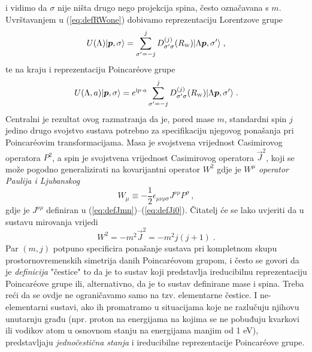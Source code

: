i vidimo da $\sigma$ nije ništa drugo nego projekcija spina, često označavana s $m$.
Uvrštavanjem u (\ref{eq:defRWone}) dobivamo reprezentaciju Lorentzove
grupe
\begin{equation}
    U(\Lambda) \ket{\vec{p}, \sigma} = 
     \sum_{\sigma'=-j}^{j} D^{(j)}_{\sigma'\sigma}(R_{\scriptscriptstyle\rm W})
     \ket{\Lambda\vec{p}, \sigma'} \;,
\end{equation}
te na kraju i reprezentaciju Poincar\'{e}ove grupe
\begin{equation}
    U(\Lambda, a) \ket{\vec{p}, \sigma} =  e^{\rmi p \cdot a}
     \sum_{\sigma'=-j}^{j} D^{(j)}_{\sigma'\sigma}(R_{\scriptscriptstyle\rm W})
     \ket{\Lambda\vec{p}, \sigma'} \;.
\end{equation}
Centralni je rezultat ovog razmatranja da je, pored mase $m$, standardni spin $j$
jedino drugo svojstvo sustava potrebno za specifikaciju njegovog ponašanja
pri Poincar\'{e}ovim transformacijama.
Masa je svojstvena vrijednost Casimirovog operatora $P^2$, a spin
je svojstvena vrijednost Casimirovog operatora $\vec{J}^2$, koji se
može pogodno generalizirati na kovarijantni operator $W^2$ gdje je
$W^{\mu}$ \emph{operator Paulija i Ljubanskog}
\begin{equation}
    W_{\mu} \equiv - \frac{1}{2} \epsilon_{\mu \nu \rho \sigma}
    J^{\nu \rho} P^{\sigma} \,,
    \label{eq:defPLj}
\end{equation}
gdje je $J^{\nu \rho}$ definiran u (\ref{eq:defJmn})--(\ref{eq:defJi0}).
Čitatelj će se lako uvjeriti da u sustavu mirovanja vrijedi
\begin{equation}
    W^2 = - m^2 \vec{J}^2 = -m^2 j (j+1) \;.
\end{equation}
Par $(m, j)$ potpuno specificira ponašanje sustava pri kompletnom skupu
prostornovremenskih simetrija danih Poincar\'{e}ovom grupom, i često se
govori da je \emph{definicija} "čestice" to da je to sustav koji predstavlja
ireducibilnu reprezentaciju Poincar\'{e}ove grupe ili, alternativno,
da je to sustav definirane mase i spina.
Treba reći da se ovdje ne ograničavamo samo na tzv. elementarne čestice.
I ne-elementarni sustavi, ako ih promatramo u situacijama koje ne razlučuju
njihovu unutarnju građu (npr. proton na energijama na kojima se ne pobuđuju
kvarkovi ili vodikov atom u osnovnom stanju na energijama manjim od 1 eV),
predstavljaju \emph{jednočestična stanja} i ireducibilne reprezentacije
Poincar\'{e}ove grupe.


